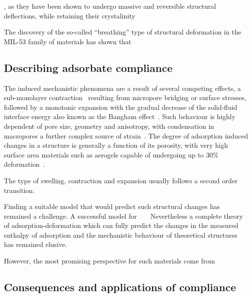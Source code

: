 , as they have been shown to undergo massive and 
reversible structural deflections, while retaining their 
crystalinity

The discovery of the so-called ``breathing'' type of structural
deformation in the MIL-53 family of materials has shown that 

\subsection{Describing adsorbate compliance}

The induced mechanistic phenomena are a result of several competing
effects, a sub-monolayer contraction~\cite{daceyVolumeChangesSaran1971} resulting
from micropore bridging or surface stresses, followed by a monotonic 
expansion with the gradual decrease of the solid-fluid interface energy
also known as the Bangham effect~\cite{banghamExpansionCharcoalAccompanying1928}. 
Such behaviour is highly dependent of pore size, geometry and anisotropy,
with condensation in macropores a further complex source of 
strain~\cite{dolinoAdsorptionStrainsPorous1996, ambergSTUDYADSORPTIONHYSTERESIS1952, %
guntherNovelInsightsNanopore2008}. The degree of adsorption induced
changes in a structure is generally a function of its porosity, with very high 
surface area materials such as aerogels capable of undergoing up 
to 30\% deformation~\cite{reichenauerNitrogenSorptionAerogels2001}.

The type of
swelling, contraction and expansion usually follows a second order
transition.

Finding a suitable model that would predict such structural changes
has remained a challenge. A successful model for 
~\cite{neimarkStressBasedModelBreathing2010}
~\cite{gorAdsorptionInducedDeformationMesoporous2010}
Nevertheless a complete theory of adsorption-deformation 
which can fully predict the changes in the measured enthalpy of 
adsorption and the mechanistic behaviour of theoretical structures
has remained elusive.


However, the most promising perspective for such materials come from


\subsection{Consequences and applications of compliance}

